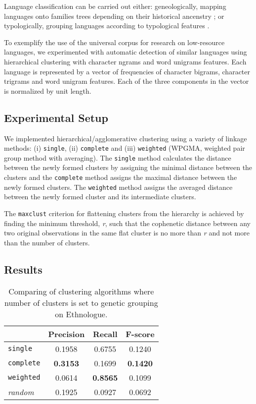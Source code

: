 Language classification can be carried out either: geneologically, mapping languages onto families trees depending on their historical ancenstry \cite{swadesh1952,starostin2010}; or typologically, grouping languages according to typological features \cite{georgi2010wals,daume2009}.

To exemplify the use of the universal corpus for research on low-resource languages, we experimented with automatic detection of similar languages using hierarchical clustering with character ngrams and word unigrams features. Each language is represented by a vector of frequencies of  character bigrams, character trigrams and word unigram features. Each of the three components in the vector is normalized by unit length.


\subsection{Experimental Setup}
We implemented hierarchical/agglomerative clustering using a variety of linkage methods: (i) \texttt{single}, (ii) \texttt{complete} and (iii) \texttt{weighted} (WPGMA, weighted pair group method with averaging). The \texttt{single} method calculates the distance between the newly formed clusters by assigning the minimal distance between the clusters and the \texttt{complete} method assigns the maximal distance between the newly formed clusters. The \texttt{weighted} method assigns the averaged distance between the newly formed cluster and its intermediate clusters. 

The \texttt{maxclust} criterion for flattening clusters from the hierarchy is achieved by finding the minimum threshold, \emph{r}, such that the cophenetic distance between any two original observations in the same flat cluster is no more than \emph{r} and not more than the number of clusters.

\newpage
\subsection{Results}
\begin{table*}[h!]
\begin{centering}

    \begin{tabular}{l|ccc}
    ~        & Precision & Recall       & F-score    \\ \hline
    \texttt{single} & 0.1958	& 0.6755	 & 0.1240  \\
	\texttt{complete} & \textbf{0.3153}	& 0.1699	 & \textbf{0.1420} \\
	\texttt{weighted} & 0.0614	& \textbf{0.8565}	 & 0.1099 \\ \hline
	\emph{random} & 0.1925 &	0.0927 & 	0.0692 \\
    \end{tabular}
\caption{Comparing of clustering algorithms where number of clusters is set to genetic grouping on Ethnologue.}
\end{centering}
\label{tab:cluster}
\end{table*}
